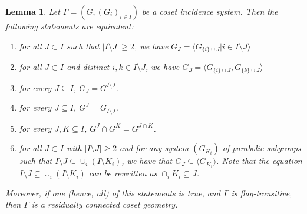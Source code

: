 \documentclass[11pt,letterpaper]{amsart}
\newtheorem{lemma}[prop]{Lemma}
\begin{document}
\begin{lemma}\label{lem:RCequivs}
    Let $\Gamma = (G,(G_i)_{i\in I})$ be a coset incidence system. Then the following statements are equivalent:
    \begin{enumerate}
        \item for all $J \subset I$ such that $|I \setminus J| \geq 2$, we have
        $G_J = \langle G_{\{i\} \cup J} | i \in I \setminus J \rangle$\label{lem:RCequivs:itm:RC1}
        \item for all $J \subset I$ and distinct $i,k\in I\setminus J$, we have 
        $G_J = \langle G_{\{i\} \cup J} , G_{\{k\} \cup J} \rangle$ \label{lem:RCequivs:itm:RC2}
        \item for every $J\subseteq I$, $G_{J} = G^{I\setminus J}$.\label{lem:RCequivs:itm:BottomUp}
        \item for every $J\subseteq I$, $G^J = G_{I\setminus J}$.\label{lem:RCequivs:itm:UpBottom}
        \item for every $J,K\subseteq I$, $G^J\cap G^K = G^{J\cap K}$.\label{lem:RCequivs:itm:Intersection}
        \item for all $J \subset I$ with $| I \setminus J| \geq 2$ and for any system $(G_{K_i})$ of parabolic subgroups such that $I \setminus J \subseteq \cup_i (I \setminus K_i)$, we have that $G_J \subseteq \langle G_{K_i} \rangle$. Note that the equation $I \setminus J \subseteq \cup_i (I \setminus K_i)$ can be rewritten as $\cap_i K_i \subseteq J$.\label{lem:RCequivs:itm:Parabolics}
    \end{enumerate}
    Moreover, if one (hence, all) of this statements is true, and $\Gamma$ is flag-transitive, then $\Gamma$ is a residually connected coset geometry.
\end{lemma}
\end{document}
